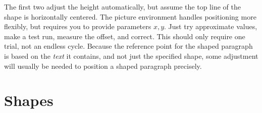 \documentclass[draft]{article}
\makeatletter
\DeclareRobustCommand{\_}{%
  \ifmmode \nfss@text{\textunderscore}\else \BreakableUnderscore \fi}
\makeatother
\begin{document}
The first two adjust the height automatically, but assume the
top line of the shape is horizontally centered.  The picture
environment handles positioning more flexibly, but requires
you to provide parameters $x,y$. Just try approximate values,
make a test run, measure the offset, and correct. This should
only require one trial, not an endless cycle. Because the 
reference point for the shaped paragraph is based on the \emph{text} 
it contains, and not just the specified shape, some adjustment
will usually be needed to position a shaped paragraph precisely.



\section{Shapes}
\end{document}

